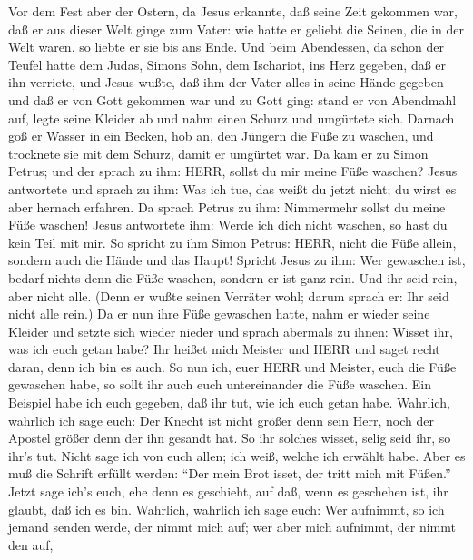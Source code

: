  Vor dem Fest aber der Ostern, da Jesus erkannte, daß seine
Zeit gekommen war, daß er aus dieser Welt ginge zum Vater: wie hatte er
geliebt die Seinen, die in der Welt waren, so liebte er sie bis ans
Ende.  Und beim Abendessen, da schon der Teufel hatte dem
Judas, Simons Sohn, dem Ischariot, ins Herz gegeben, daß er ihn
verriete,  und Jesus wußte, daß ihm der Vater alles in seine
Hände gegeben und daß er von Gott gekommen war und zu Gott ging:
 stand er von Abendmahl auf, legte seine Kleider ab und nahm
einen Schurz und umgürtete sich.  Darnach goß er Wasser in
ein Becken, hob an, den Jüngern die Füße zu waschen, und trocknete sie
mit dem Schurz, damit er umgürtet war.  Da kam er zu Simon
Petrus; und der sprach zu ihm: HERR, sollst du mir meine Füße waschen?
 Jesus antwortete und sprach zu ihm: Was ich tue, das weißt
du jetzt nicht; du wirst es aber hernach erfahren.  Da
sprach Petrus zu ihm: Nimmermehr sollst du meine Füße waschen! Jesus
antwortete ihm: Werde ich dich nicht waschen, so hast du kein Teil mit
mir.  So spricht zu ihm Simon Petrus: HERR, nicht die Füße
allein, sondern auch die Hände und das Haupt!  Spricht
Jesus zu ihm: Wer gewaschen ist, bedarf nichts denn die Füße waschen,
sondern er ist ganz rein. Und ihr seid rein, aber nicht alle.
 (Denn er wußte seinen Verräter wohl; darum sprach er: Ihr
seid nicht alle rein.)  Da er nun ihre Füße gewaschen
hatte, nahm er wieder seine Kleider und setzte sich wieder nieder und
sprach abermals zu ihnen: Wisset ihr, was ich euch getan habe?
 Ihr heißet mich Meister und HERR und saget recht daran,
denn ich bin es auch.  So nun ich, euer HERR und Meister,
euch die Füße gewaschen habe, so sollt ihr auch euch untereinander die
Füße waschen.  Ein Beispiel habe ich euch gegeben, daß ihr
tut, wie ich euch getan habe.  Wahrlich, wahrlich ich sage
euch: Der Knecht ist nicht größer denn sein Herr, noch der Apostel
größer denn der ihn gesandt hat.  So ihr solches wisset,
selig seid ihr, so ihr's tut.  Nicht sage ich von euch
allen; ich weiß, welche ich erwählt habe. Aber es muß die Schrift
erfüllt werden: ``Der mein Brot isset, der tritt mich mit Füßen.''
 Jetzt sage ich's euch, ehe denn es geschieht, auf daß,
wenn es geschehen ist, ihr glaubt, daß ich es bin. 
Wahrlich, wahrlich ich sage euch: Wer aufnimmt, so ich jemand senden
werde, der nimmt mich auf; wer aber mich aufnimmt, der nimmt den auf,
